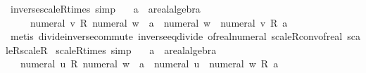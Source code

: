 \begin{isabellebody}
\endisatagproof
{\isafoldproof}%
%
\isadelimproof
\isanewline
%
\endisadelimproof
\isanewline
{}\isamarkupfalse%
\ inverse{\isacharunderscore}{\kern0pt}scaleR{\isacharunderscore}{\kern0pt}times\ {\isacharbrackleft}{\kern0pt}simp{\isacharbrackright}{\kern0pt}{\isacharcolon}{\kern0pt}\isanewline
\ \ \ a\ {\isacharcolon}{\kern0pt}{\isacharcolon}{\kern0pt}\ {\isachardoublequoteopen}{\isacharprime}{\kern0pt}a{\isacharcolon}{\kern0pt}{\isacharcolon}{\kern0pt}real{\isacharunderscore}{\kern0pt}algebra{\isacharunderscore}{\kern0pt}{}{\isachardoublequoteclose}\isanewline
\ \ \ {\isachardoublequoteopen}{\isacharparenleft}{\kern0pt}{}\ {\isacharslash}{\kern0pt}\ numeral\ v{\isacharparenright}{\kern0pt}\ {\isacharasterisk}{\kern0pt}\isactrlsub R\ {\isacharparenleft}{\kern0pt}numeral\ w\ {\isacharasterisk}{\kern0pt}\ a{\isacharparenright}{\kern0pt}\ {\isacharequal}{\kern0pt}\ {\isacharparenleft}{\kern0pt}numeral\ w\ {\isacharslash}{\kern0pt}\ numeral\ v{\isacharparenright}{\kern0pt}\ {\isacharasterisk}{\kern0pt}\isactrlsub R\ a{\isachardoublequoteclose}\isanewline
%
\isadelimproof
%
\endisadelimproof
%
\isatagproof
{}\isamarkupfalse%
\ {\isacharparenleft}{\kern0pt}metis\ divide{\isacharunderscore}{\kern0pt}inverse{\isacharunderscore}{\kern0pt}commute\ inverse{\isacharunderscore}{\kern0pt}eq{\isacharunderscore}{\kern0pt}divide\ of{\isacharunderscore}{\kern0pt}real{\isacharunderscore}{\kern0pt}numeral\ scaleR{\isacharunderscore}{\kern0pt}conv{\isacharunderscore}{\kern0pt}of{\isacharunderscore}{\kern0pt}real\ scaleR{\isacharunderscore}{\kern0pt}scaleR{\isacharparenright}{\kern0pt}%
\endisatagproof
{\isafoldproof}%
%
\isadelimproof
\isanewline
%
\endisadelimproof
\isanewline
{}\isamarkupfalse%
\ scaleR{\isacharunderscore}{\kern0pt}times\ {\isacharbrackleft}{\kern0pt}simp{\isacharbrackright}{\kern0pt}{\isacharcolon}{\kern0pt}\isanewline
\ \ \ a\ {\isacharcolon}{\kern0pt}{\isacharcolon}{\kern0pt}\ {\isachardoublequoteopen}{\isacharprime}{\kern0pt}a{\isacharcolon}{\kern0pt}{\isacharcolon}{\kern0pt}real{\isacharunderscore}{\kern0pt}algebra{\isacharunderscore}{\kern0pt}{}{\isachardoublequoteclose}\isanewline
\ \ \ {\isachardoublequoteopen}{\isacharparenleft}{\kern0pt}numeral\ u{\isacharparenright}{\kern0pt}\ {\isacharasterisk}{\kern0pt}\isactrlsub R\ {\isacharparenleft}{\kern0pt}numeral\ w\ {\isacharasterisk}{\kern0pt}\ a{\isacharparenright}{\kern0pt}\ {\isacharequal}{\kern0pt}\ {\isacharparenleft}{\kern0pt}numeral\ u\ {\isacharasterisk}{\kern0pt}\ numeral\ w{\isacharparenright}{\kern0pt}\ {\isacharasterisk}{\kern0pt}\isactrlsub R\ a{\isachardoublequoteclose}\isanewline

\end{isabellebody}
